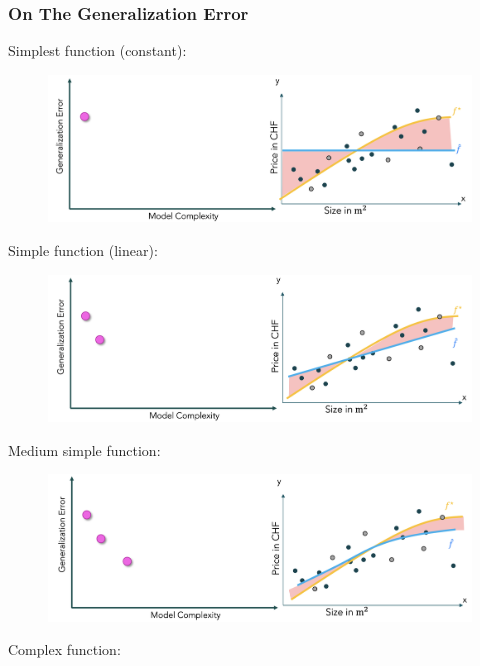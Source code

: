 \documentclass[a4paper]{extarticle}
\begin{document}
\subsubsection{On The Generalization Error}

Simplest function (constant):

\begin{figure}[H]
    \includegraphics[width=15cm]{../images/IntroML_Fig3-11}
    \centering
\end{figure}

Simple function (linear):

\begin{figure}[H]
    \includegraphics[width=15cm]{../images/IntroML_Fig3-12}
    \centering
\end{figure}

Medium simple function:

\begin{figure}[H]
    \includegraphics[width=15cm]{../images/IntroML_Fig3-13}
    \centering
\end{figure}

Complex function:
\end{document}

